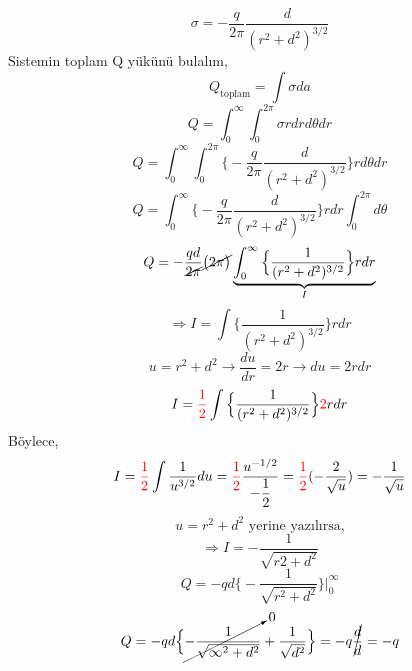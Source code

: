 \begin{theorem}
\[ \sigma = - \dfrac{q}{2 \pi} \dfrac{d}{(r^{2} + d^{2})^{3/2}} \]
Sistemin toplam Q yükünü bulalım,
\[Q_{\textrm{toplam}} = \int \sigma da \]
\[ Q = \int_{0}^{\infty} \int_{0}^{2 \pi} \sigma r dr d\theta dr \]
\[ Q = \int_{0}^{\infty} \int_{0}^{2 \pi} \Big\{  - \dfrac{q}{2 \pi} \dfrac{d}{(r^{2} + d^{2})^{3/2}} \Big\} r d\theta dr \]
\[ Q = \int_{0}^{\infty} \Big\{  - \dfrac{q}{2 \pi} \dfrac{d}{(r^{2} + d^{2})^{3/2}} \Big\} r  dr  \int_{0}^{2 \pi} d\theta \]
\[ Q = - \dfrac{qd}{\cancel{2 \pi}} \cancel{ \big( 2 \pi \big)} \underbrace{\int_{0}^{\infty} \Big\{ \dfrac{1}{(r^{2} + d^{2})^{3/2}} \Big\} r  dr}_{I}  \]
\[ \Rightarrow I = \int \Big\{ \dfrac{1}{(r^{2} + d^{2})^{3/2}} \Big\} r  dr \]
\[ u = r^{2} + d^{2} \rightarrow \dfrac{du}{dr} = 2r \rightarrow du = 2r dr \]
\[ I =  \begingroup \color{red} \dfrac{1}{2} \endgroup \int \Big\{ \dfrac{1}{(r^{2} + d^{2})^{3/2}} \Big\}  \begingroup \color{red}2 \endgroup r  dr \]
Böylece,
\[ I =  \begingroup \color{red} \dfrac{1}{2} \endgroup \int \dfrac{1}{u^{3/2}} du =\begingroup \color{red} \dfrac{1}{2} \endgroup \dfrac{u^{-1/2}}{-\dfrac{1}{2}} = \begingroup \color{red} \dfrac{1}{2} \endgroup  ( - \dfrac{2}{\sqrt{u}} ) = - \dfrac{1}{\sqrt{u}} \]
\[  u = r^{2} + d^{2} \textrm{ yerine yazılırsa,} \]
\[ \Rightarrow I = - \dfrac{1}{\sqrt{r{2} + d^{2}}} \]
\[ Q = - qd \Big\{ - \dfrac{1}{\sqrt{r^{2} + d^{2}}} \Big\} \Bigg|^{\infty}_{0} \]
\[ Q = - qd \Big\{ \cancelto{0}{- \dfrac{1}{\sqrt{\infty^{2} + d^{2}}}} +  \dfrac{1}{\sqrt{d^{2}}} \Big\} = - q \cancel{\dfrac{d}{d}} = -q\]
\end{theorem}

